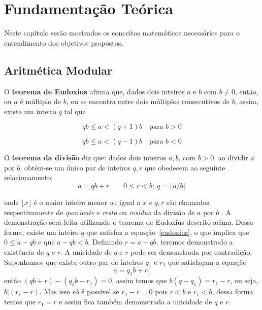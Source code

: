 \chapter{Fundamentação Teórica}
Neste capítulo serão mostrados os conceitos matemáticos necessários para o entendimento dos objetivos propostos.

%
%
\section{Aritmética Modular}

O \textbf{teorema de Eudoxius} afirma que, dados dois inteiros \(a\) e \(b\) com \(b \neq 0\), então, ou \(a\) é múltiplo de \(b\), ou se encontra entre dois múltiplos 
consecutivos de \(b\), assim, existe um inteiro \(q\) tal que \cite{Santos:2014}

\begin{equation} \label{eudoxius}
  qb \leq a < (q + 1)b\quad\mbox{para \(b > 0\)}
\end{equation}

\begin{equation}
  qb \leq a < (q - 1)b\quad\mbox{para \(b < 0\)}
\end{equation}

O \textbf{teorema da divisão} diz que: dados dois inteiros $a, b$, com $b > 0$, ao dividir \(a\) por \(b\), obtém-se um único par de inteiros $q, r$ que obedecem ao seguinte relacionamento:
\begin{equation}
  a=qb+r \qquad 0 \leq r<b;\ q=\lfloor a/b \rfloor
\end{equation}

onde $\lfloor x \rfloor$ é o maior inteiro menor ou igual a \(x\) e $q,r$ são chamados respectivamente de \textit{quociente} e \textit{resto} ou \textit{resíduo} da divisão de \(a\) por \(b\) \cite{Santos:2014}. A demonstração será feita utilizando o teorema de Eudoxius descrito acima. Dessa forma, existe um inteiro \(q\) que satisfaz a equação~\ref{eudoxius}, o que implica que \(0 \leq a - qb\) e que \(a - qb < b\). Definindo \(r = a - qb\), teremos demonstrado a existência de \(q\) e \(r\). A unicidade de \(q\) e 
\(r\) pode ser demonstrada por contradição. Suponhamos que exista outro par de inteiros \(q_1\) e \(r_1\) que satisfaçam a equação
\begin{equation}
  a = q_1b + r_1
\end{equation}
então \((qb + r) - (q_1b - r_1) = 0\), assim temos que \(b(q - q_1) = r_1 - r\), ou seja, \(b|(r_1 - r)\). Mas isso só é possível se \(r_1 - r = 0\) 
pois \(r < b\) e \(r_1 < b\), dessa forma temos que \(r_1 = r\) 
e assim fica também demonstrada a unicidade de \(q\) e \(r\). \cite{Santos:2014}


